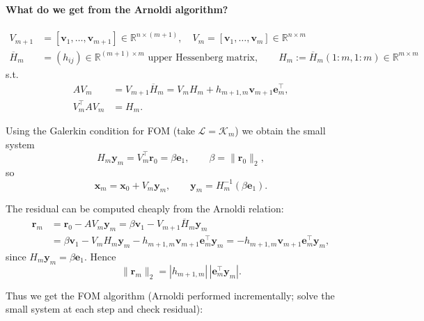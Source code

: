 \paragraph{What do we get from the Arnoldi algorithm?}
\begin{align*}
    V_{m+1}        & = [\mathbf{v}_1, \ldots, \mathbf{v}_{m+1}] \in \mathbb{R}^{n \times (m+1)}, \quad V_m = [\mathbf{v}_1, \ldots, \mathbf{v}_m] \in \mathbb{R}^{n \times m} \\
    \overline{H}_m & = (h_{ij}) \in \mathbb{R}^{(m+1) \times m} \text{ upper Hessenberg matrix}, \qquad H_m := \overline{H}_m(1:m,1:m) \in \mathbb{R}^{m\times m}
\end{align*}
s.t.
\begin{align*}
    A V_m &= V_{m+1} \overline{H}_m = V_m H_m + h_{m+1,m} \mathbf{v}_{m+1}\mathbf{e}_m^\top,\\
    V_m^\top A V_m &= H_m.
\end{align*}

Using the Galerkin condition for FOM (take $\mathcal{L}=\mathcal{K}_m$) we obtain the small system
\[
    H_m \mathbf{y}_m = V_m^\top \mathbf{r}_0 = \beta \mathbf{e}_1, \qquad \beta=\|\mathbf{r}_0\|_2,
\]
so
\[
    \mathbf{x}_m = \mathbf{x}_0 + V_m \mathbf{y}_m, \qquad \mathbf{y}_m = H_m^{-1} (\beta \mathbf{e}_1).
\]

The residual can be computed cheaply from the Arnoldi relation:
\begin{align*}
    \mathbf{r}_m &= \mathbf{r}_0 - A V_m \mathbf{y}_m
    = \beta \mathbf{v}_1 - V_{m+1}\overline{H}_m \mathbf{y}_m \\
    &= \beta \mathbf{v}_1 - V_m H_m \mathbf{y}_m - h_{m+1,m}\mathbf{v}_{m+1} \mathbf{e}_m^\top \mathbf{y}_m
    = -h_{m+1,m}\mathbf{v}_{m+1} \mathbf{e}_m^\top \mathbf{y}_m,
\end{align*}
since $H_m\mathbf{y}_m=\beta\mathbf{e}_1$. Hence
\[
    \|\mathbf{r}_m\|_2 = |h_{m+1,m}|\,|\mathbf{e}_m^\top \mathbf{y}_m|.
\]

Thus we get the FOM algorithm (Arnoldi performed incrementally; solve the small system at each step and check residual):


